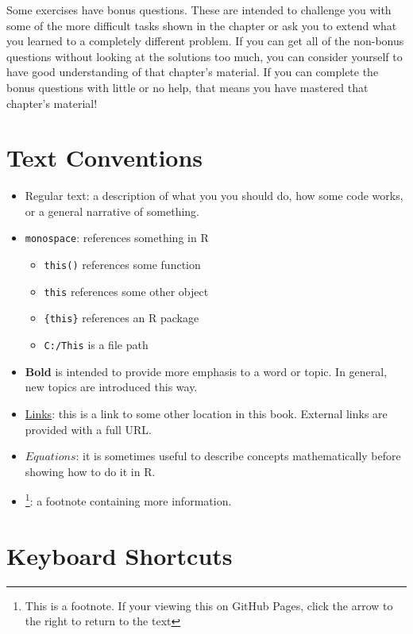 \documentclass[]{book}
\providecommand{\tightlist}{%
  \setlength{\itemsep}{0pt}\setlength{\parskip}{0pt}}
\let\rmarkdownfootnote\footnote%
\def\footnote{\protect\rmarkdownfootnote}
\theoremstyle{definition}
\theoremstyle{definition}
\theoremstyle{definition}
\theoremstyle{remark}
\begin{document}
Some exercises have bonus questions. These are intended to challenge you
with some of the more difficult tasks shown in the chapter or ask you to
extend what you learned to a completely different problem. If you can
get all of the non-bonus questions without looking at the solutions too
much, you can consider yourself to have good understanding of that
chapter's material. If you can complete the bonus questions with little
or no help, that means you have mastered that chapter's material!

\hypertarget{notation}{\section*{Text Conventions}\label{notation}}

\begin{itemize}
\tightlist
\item
  Regular text: a description of what you you should do, how some code
  works, or a general narrative of something.
\item
  \texttt{monospace}: references something in R

  \begin{itemize}
  \tightlist
  \item
    \texttt{this()} references some function
  \item
    \texttt{this} references some other object
  \item
    \texttt{\{this\}} references an R package
  \item
    \texttt{C:/This} is a file path
  \end{itemize}
\item
  \textbf{Bold} is intended to provide more emphasis to a word or topic.
  In general, new topics are introduced this way.
\item
  \protect\hyperlink{notation}{Links}: this is a link to some other
  location in this book. External links are provided with a full URL.
\item
  \(Equations\): it is sometimes useful to describe concepts
  mathematically before showing how to do it in R.
\item
  \footnote{This is a footnote. If your viewing this on GitHub Pages,
    click the arrow to the right to return to the text}: a footnote
  containing more information.
\end{itemize}

\section*{Keyboard Shortcuts}\label{keyboard-shortcuts}
\end{document}
